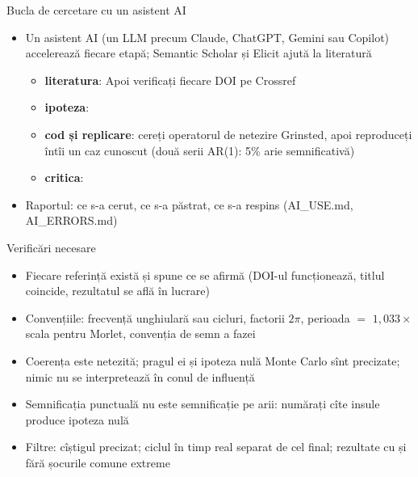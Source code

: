 \begin{frame}{Bucla de cercetare cu un asistent AI}
\itemsize{\footnotesize}
\begin{itemize}
    \item Un asistent AI (un LLM precum Claude, ChatGPT, Gemini sau Copilot) accelerează fiecare etapă; Semantic Scholar și Elicit ajută la literatură
    \begin{itemize}
        \item \textbf{literatura}:  Apoi verificați fiecare DOI pe Crossref
        \item \textbf{ipoteza}: 
        \item \textbf{cod și replicare}: cereți operatorul de netezire Grinsted, apoi reproduceți întîi un caz cunoscut (două serii AR(1): 5\% arie semnificativă)
        \item \textbf{critica}: 
    \end{itemize}
    \item Raportul: ce s-a cerut, ce s-a păstrat, ce s-a respins (AI\_USE.md, AI\_ERRORS.md)
\end{itemize}
\end{frame}

\begin{frame}{Verificări necesare}
\itemsize{\small}
\begin{itemize}
    \item Fiecare referință există și spune ce se afirmă (DOI-ul funcționează, titlul coincide, rezultatul se află în lucrare)
    \item Convențiile: frecvență unghiulară sau cicluri, factorii $2\pi$, perioada $=$ $1{,}033\times$ scala pentru Morlet, convenția de semn a fazei
    \item Coerența este netezită; pragul ei și ipoteza nulă Monte Carlo sînt precizate; nimic nu se interpretează în conul de influență
    \item Semnificația punctuală nu este semnificație pe arii: numărați cîte insule produce ipoteza nulă
    \item Filtre: cîștigul precizat; ciclul în timp real separat de cel final; rezultate cu și fără șocurile comune extreme
\end{itemize}
\end{frame}

